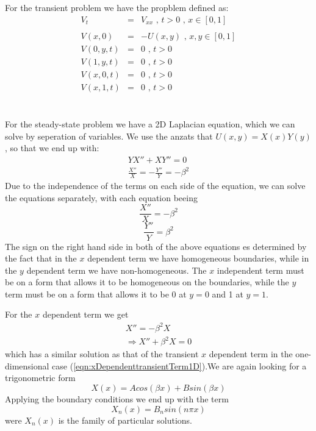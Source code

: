 \documentclass{article}
\begin{document}
For the transient problem we have the propblem defined as:
\begin{subequations}
\begin{eqnarray}
\label{eqn:transientPDE}
V_t &=& V_{xx} \textit{ , } t>0 \textit{ , } x \in [0,1] \\ \nonumber
\\
\label{eqn:transientICPDE}
V(x,0) &=& -U(x,y) \textit{ , } x,y \in [0,1] \\
V(0,y,t) &=& 0 \textit{ , } t>0 \\
V(1,y,t) &=& 0 \textit{ , } t>0 \\
V(x,0,t) &=& 0 \textit{ , } t>0 \\
V(x,1,t) &=& 0 \textit{ , } t>0 
\end{eqnarray}
\end{subequations}
\\\\
For the steady-state problem we have a 2D Laplacian equation, which we can solve by seperation of variables. We use the anzats that $U(x,y) = X(x)Y(y)$, so that we end up with:
\begin{eqnarray}
\nonumber
YX'' + XY''=0 \\ \nonumber
\frac{X''}{X} = - \frac{Y''}{Y} = -\beta^2
\end{eqnarray}
Due to the independence of the terms on each side of the equation, we can solve the equations separately, with each equation beeing
\begin{equation}
\frac{X''}{X} = -\beta^2 \nonumber
\end{equation}
\begin{equation}
\frac{Y''}{Y} = \beta^2 \nonumber
\end{equation}
The sign on the right hand side in both of the above equations es determined by the fact that in the $x$ dependent term we have homogeneous boundaries, while in the $y$ dependent term we have non-homogeneous. The $x$ independent term must be on a form that allows it to be homogeneous on the boundaries, while the $y$ term must be on a form that allows it to be 0 at $y=0$ and 1 at $y=1$. 

For the $x$ dependent term we get
\begin{eqnarray}
\nonumber
X'' = -\beta^2 X \\ \nonumber
\Rightarrow X'' + \beta^2 X = 0 
\end{eqnarray}
which has a similar solution as that of the transient $x$ dependent term in the one-dimensional case (\ref{eqn:xDependenttransientTerm1D}).We are again looking for a trigonometric form
\begin{equation}
X(x) = Acos(\beta x) + Bsin(\beta x) \nonumber
\end{equation}
Applying the boundary conditions we end up with the term
\begin{equation}
X_n(x) = B_nsin(n\pi x)
\label{eqn:xDependenSteadyState2D}
\end{equation}
were ${X_n(x)}$ is the family of particular solutions.\\
\\
\end{document}
